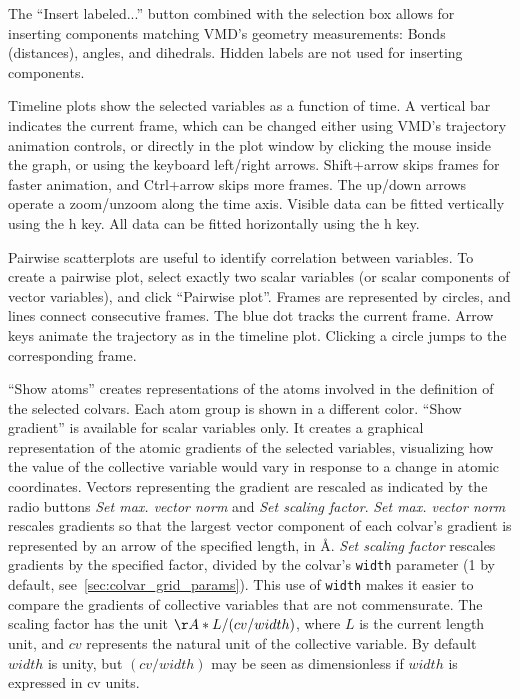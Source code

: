 {The ``Insert labeled...'' button combined with the selection box allows for inserting components matching VMD's geometry measurements: Bonds (distances), angles, and dihedrals.
Hidden labels are not used for inserting components.


Timeline plots show the selected variables as a function of time. A vertical bar indicates the current frame, which can be changed either using VMD's trajectory animation controls, or directly in the plot window by clicking the mouse inside the graph, or using the keyboard left/right arrows.
Shift+arrow skips frames for faster animation, and Ctrl+arrow skips more frames.
The up/down arrows operate a zoom/unzoom along the time axis.
Visible data can be fitted vertically using the h key. All data can be fitted horizontally using the h key.

Pairwise scatterplots are useful to identify correlation between variables. To create a pairwise plot, select exactly two scalar variables (or scalar components of vector variables), and click ``Pairwise plot''.
Frames are represented by circles, and lines connect consecutive frames.
The blue dot tracks the current frame.
Arrow keys animate the trajectory as in the timeline plot.
Clicking a circle jumps to the corresponding frame.

``Show atoms'' creates representations of the atoms involved in the definition of the selected colvars.
Each atom group is shown in a different color.
``Show gradient'' is available for scalar variables only.
It creates a graphical representation of the atomic gradients of the selected variables, visualizing how the value of the collective variable would vary in response to a change in atomic coordinates.
Vectors representing the gradient are rescaled as indicated by the radio buttons \emph{Set max. vector norm} and \emph{Set scaling factor}.
\emph{Set max. vector norm} rescales gradients so that the largest vector component of each colvar's gradient is represented by an arrow of the specified length, in \AA.
\emph{Set scaling factor} rescales gradients by the specified factor, divided by the colvar's \texttt{width} parameter (1 by default, see~\ref{sec:colvar_grid_params}).
This use of \texttt{width} makes it easier to compare the gradients of collective variables that are not commensurate.
The scaling factor has the unit $\AA * L / (cv / width)$, where $L$ is the current length unit, and $cv$ represents the natural unit of the collective variable.
By default $width$ is unity, but $(cv / width)$ may be seen as dimensionless if $width$ is expressed in cv units.

} %

